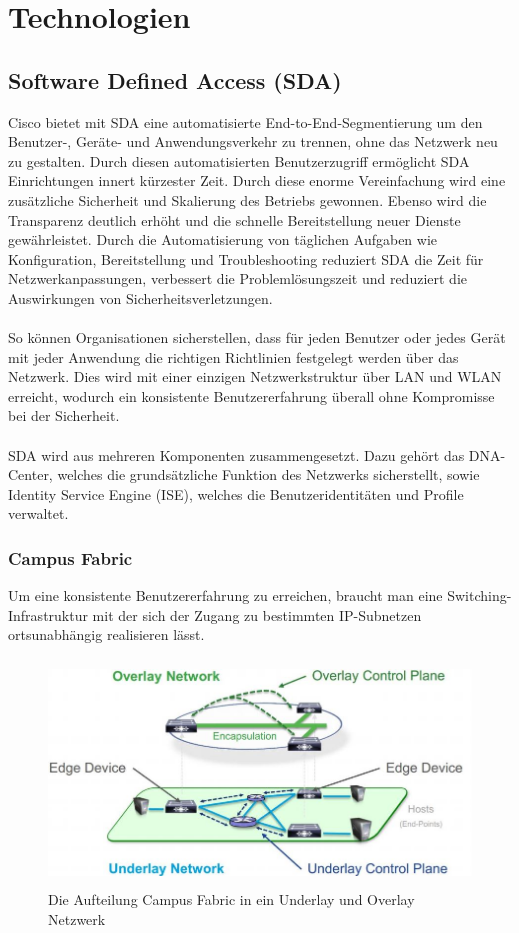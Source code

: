 \section{Technologien}

\subsection{Software Defined Access (SDA)}
Cisco bietet mit SDA eine automatisierte End-to-End-Segmentierung um den Benutzer-, Geräte- und Anwendungsverkehr zu trennen, ohne das Netzwerk neu zu gestalten. Durch diesen automatisierten Benutzerzugriff ermöglicht SDA Einrichtungen innert kürzester Zeit. Durch diese enorme Vereinfachung wird eine zusätzliche Sicherheit und Skalierung des Betriebs gewonnen. Ebenso wird die Transparenz deutlich erhöht und die schnelle Bereitstellung neuer Dienste gewährleistet. Durch die Automatisierung von täglichen Aufgaben wie Konfiguration, Bereitstellung und Troubleshooting reduziert SDA die Zeit für Netzwerkanpassungen, verbessert die Problemlösungszeit und reduziert die Auswirkungen von Sicherheitsverletzungen.\\
\\
So können Organisationen sicherstellen, dass für jeden Benutzer oder jedes Gerät mit jeder Anwendung die richtigen Richtlinien festgelegt werden über das Netzwerk. Dies wird mit einer einzigen Netzwerkstruktur über LAN und WLAN erreicht, wodurch ein konsistente Benutzererfahrung überall ohne Kompromisse bei der Sicherheit. \\
\\
SDA wird aus mehreren Komponenten zusammengesetzt. Dazu gehört das DNA-Center, welches die grundsätzliche Funktion des Netzwerks sicherstellt, sowie Identity Service Engine (ISE), welches die Benutzeridentitäten und Profile verwaltet. \cite{sda-definition}

\subsubsection{Campus Fabric} \label{CampusFabric}
Um eine konsistente Benutzererfahrung zu erreichen, braucht man eine Switching-Infrastruktur mit der sich der Zugang zu bestimmten IP-Subnetzen ortsunabhängig realisieren lässt. \cite{campusfabric-introduction} \\

\begin{figure}[H]
	\centering
	\includegraphics[height=6cm]{img/campusfabric.jpg}
	\caption{Die Aufteilung Campus Fabric in ein Underlay und Overlay Netzwerk}
	\label{fig:Campus Fabric}
\end{figure}

